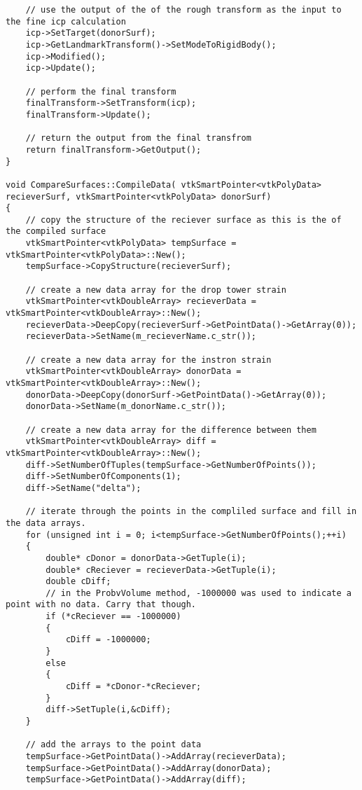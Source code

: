 \begin{lstlisting}
    // use the output of the of the rough transform as the input to the fine icp calculation
    icp->SetTarget(donorSurf);
    icp->GetLandmarkTransform()->SetModeToRigidBody();
    icp->Modified();
    icp->Update();

    // perform the final transform
    finalTransform->SetTransform(icp);
    finalTransform->Update();

    // return the output from the final transfrom
    return finalTransform->GetOutput();
}

void CompareSurfaces::CompileData( vtkSmartPointer<vtkPolyData> recieverSurf, vtkSmartPointer<vtkPolyData> donorSurf)
{
    // copy the structure of the reciever surface as this is the of the compiled surface
    vtkSmartPointer<vtkPolyData> tempSurface = vtkSmartPointer<vtkPolyData>::New();
    tempSurface->CopyStructure(recieverSurf);

    // create a new data array for the drop tower strain
    vtkSmartPointer<vtkDoubleArray> recieverData = vtkSmartPointer<vtkDoubleArray>::New();
    recieverData->DeepCopy(recieverSurf->GetPointData()->GetArray(0));
    recieverData->SetName(m_recieverName.c_str());

    // create a new data array for the instron strain
    vtkSmartPointer<vtkDoubleArray> donorData = vtkSmartPointer<vtkDoubleArray>::New();
    donorData->DeepCopy(donorSurf->GetPointData()->GetArray(0));
    donorData->SetName(m_donorName.c_str());

    // create a new data array for the difference between them
    vtkSmartPointer<vtkDoubleArray> diff = vtkSmartPointer<vtkDoubleArray>::New();
    diff->SetNumberOfTuples(tempSurface->GetNumberOfPoints());
    diff->SetNumberOfComponents(1);
    diff->SetName("delta");

    // iterate through the points in the compliled surface and fill in the data arrays.
    for (unsigned int i = 0; i<tempSurface->GetNumberOfPoints();++i)
    {
        double* cDonor = donorData->GetTuple(i);
        double* cReciever = recieverData->GetTuple(i);
        double cDiff;
        // in the ProbvVolume method, -1000000 was used to indicate a point with no data. Carry that though.
        if (*cReciever == -1000000)
        {
            cDiff = -1000000;
        }
        else
        {
            cDiff = *cDonor-*cReciever;
        }
        diff->SetTuple(i,&cDiff);
    }

    // add the arrays to the point data
    tempSurface->GetPointData()->AddArray(recieverData);
    tempSurface->GetPointData()->AddArray(donorData);
    tempSurface->GetPointData()->AddArray(diff);


\end{lstlisting}
